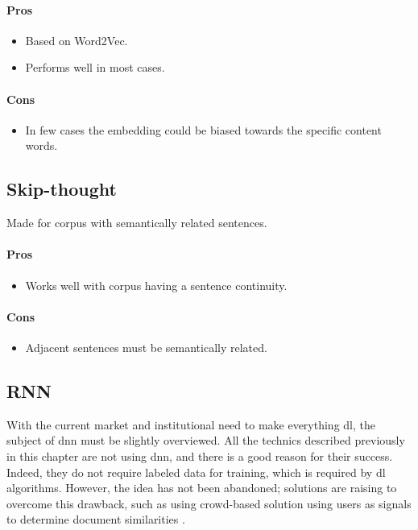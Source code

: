 \paragraph{Pros}
\begin{itemize}
    \setlength\itemsep{0em}
    \item Based on Word2Vec.
    \item Performs well in most cases.
\end{itemize}
\paragraph{Cons}
\begin{itemize}
    \setlength\itemsep{0em}
    \item In few cases the embedding could be biased towards the specific content words.\cite{article:doc2vec_eval}
\end{itemize}

\subsection{Skip-thought\cite{article:skip-thought}}
Made for corpus with semantically related sentences.
\paragraph{Pros}
\begin{itemize}
    \setlength\itemsep{0em}
    \item Works well with corpus having a sentence continuity.
\end{itemize}
\paragraph{Cons}
\begin{itemize}
    \setlength\itemsep{0em}
    \item Adjacent sentences must be semantically related.
\end{itemize}

\subsection{RNN}
With the current market and institutional need to make everything \gls{dl}, the subject of \gls{dnn} must be slightly overviewed. All the technics described previously in this chapter are not using \gls{dnn}, and there is a good reason for their success. Indeed, they do not require labeled data for training, which is required by \gls{dl} algorithms. However, the idea has not been abandoned; solutions are raising to overcome this drawback, such as using crowd-based solution using users as signals to determine document similarities \cite{article:lstm-deep-sentence-embedding}.



